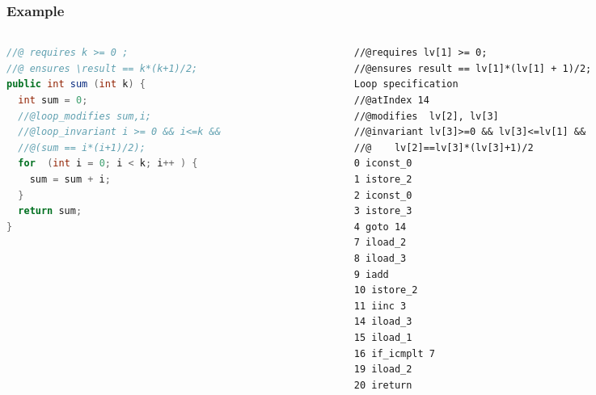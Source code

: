 \documentclass{beamer}
\begin{document}
\begin{frame}\frametitle{Example}
\begin{columns}
\begin{column}{5.1cm}
{\tiny
\begin{lstlisting}[language=java]
//@ requires k >= 0 ;
//@ ensures \result == k*(k+1)/2;
public int sum (int k) {
  int sum = 0;		
  //@loop_modifies sum,i;
  //@loop_invariant i >= 0 && i<=k && 
  //@(sum == i*(i+1)/2);
  for  (int i = 0; i < k; i++ ) {
    sum = sum + i;
  } 	
  return sum;
}
\end{lstlisting}}
\end{column}

\begin{column}{5.1cm}
{\tiny
\begin{lstlisting}[language=jvmis]
//@requires lv[1] >= 0;
//@ensures result == lv[1]*(lv[1] + 1)/2;
Loop specification
//@atIndex 14 
//@modifies  lv[2], lv[3]
//@invariant lv[3]>=0 && lv[3]<=lv[1] &&
//@    lv[2]==lv[3]*(lv[3]+1)/2
0 iconst_0
1 istore_2
2 iconst_0
3 istore_3
4 goto 14 
7 iload_2
8 iload_3
9 iadd
10 istore_2 
11 iinc 3 
14 iload_3
15 iload_1
16 if_icmplt 7 
19 iload_2
20 ireturn
\end{lstlisting}}
\end{column}
\end{columns}

\end{frame}


\end{document}
